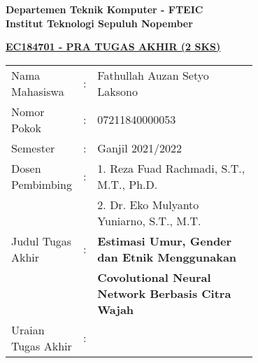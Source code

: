 \thispagestyle{empty}

\begin{flushleft}
    \textbf{Departemen Teknik Komputer - FTEIC}\\
    \textbf{Institut Teknologi Sepuluh Nopember}\\
  \end{flushleft}
  
  
  \begin{center}
    \underline{\textbf{EC184701 - PRA TUGAS AKHIR (2 SKS)}}
  \end{center}
  
  \begin{adjustwidth}{-0.2cm}{}
    \begin{tabular}{lcp{0.7\linewidth}}
  
      Nama Mahasiswa &:& Fathullah Auzan Setyo Laksono \\
      Nomor Pokok &:& 07211840000053 \\
  
      Semester &:& Ganjil 2021/2022 \\
  
      Dosen Pembimbing &:& 1. Reza Fuad Rachmadi, S.T., M.T., Ph.D. \\
      & & 2. Dr. Eko Mulyanto Yuniarno, S.T., M.T. \\
  
      Judul Tugas Akhir &:& \textbf{Estimasi Umur, Gender dan Etnik Menggunakan} \\
      & & \textbf{Covolutional Neural Network Berbasis Citra Wajah} \\
  
      Uraian Tugas Akhir &:& \\
    \end{tabular}
  \end{adjustwidth}
  
